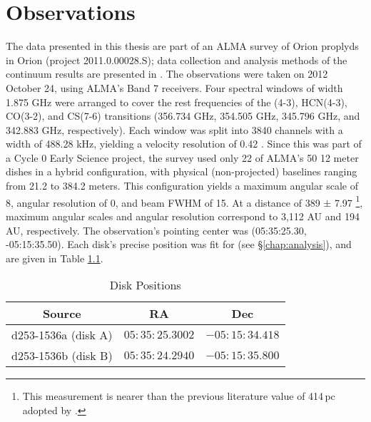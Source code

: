 \chapter{Observations}
\label{chap:observations}




The data presented in this thesis are part of an ALMA survey of Orion proplyds in Orion (project 2011.0.00028.S); data collection and analysis methods of the continuum results are presented in \citet{Mann2014}. The observations were taken on 2012 October 24, using ALMA's Band 7 receivers. Four spectral windows of width 1.875 GHz were arranged to cover the rest frequencies of the \hco(4-3), HCN(4-3), CO(3-2), and CS(7-6) transitions (356.734 GHz, 354.505 GHz, 345.796 GHz, and 342.883 GHz, respectively). Each window was split into 3840 channels with a width of 488.28 kHz, yielding a velocity resolution of 0.42 \kms. Since this was part of a Cycle 0 Early Science project, the survey used only 22 of ALMA's 50 12 meter dishes in a hybrid configuration, with physical (non-projected) baselines ranging from 21.2 to 384.2 meters. This configuration yields a maximum angular scale of 8\arcsec, angular resolution of 0, and beam FWHM of 15\arcsec. At a distance of 389 $\pm$ 7.97 \citep{GaiaCollaboration2016,GaiaCollaboration2018}\footnote{This measurement is nearer than the previous literature value of 414\,pc adopted by \citep{Factor2017}.}, maximum angular scales and angular resolution correspond to 3,112 AU and 194 AU, respectively. The observation's pointing center was (05:35:25.30, -05:15:35.50). Each disk's precise position was fit for (see \S\ref{chap:analysis}), and are given in Table \ref{table:disk_positions}.

\begin{table}
  \centering
  \caption{Disk Positions}
  \label{table:disk_positions}
  \renewcommand{\arraystretch}{1.2}
  \begin{tabular}{c | c | c }
    \toprule \toprule
      Source      &  RA            & Dec \\
    \midrule %
      d253-1536a (disk A)  &  $05:35:25.3002$ & $-05:15:34.418$  \\
      d253-1536b (disk B)  &  $05:35:24.2940$ & $-05:15:35.800$  \\
    \bottomrule
  \end{tabular}
\end{table}

